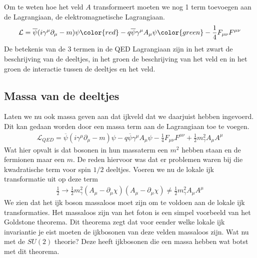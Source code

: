 \documentclass[../main.tex]{subfiles}
\begin{document}
Om te weten hoe het veld $A$ transformeert moeten we nog 1 term toevoegen aan de Lagrangiaan, de elektromagnetische Lagrangiaan.
\begin{equation}
    \begin{aligned}
        \label{eq:lok_ijk_inv_qed}
        \mathcal{L} = \overline \psi (i\gamma^\mu \partial_\mu - m)\psi {\color{red}- q\overline\psi\gamma^\mu A_\mu\psi} {\color{green}- \frac{1}{4} F_{\mu\nu}F^{\mu\nu}}
    \end{aligned}
\end{equation}
De betekenis van de 3 termen in de QED Lagrangiaan zijn in het zwart de beschrijving van de deeltjes, in het groen de beschrijving van het veld en in het groen de interactie tussen de deeltjes en het veld.

\subsection{Massa van de deeltjes}%
\label{sub:massa_van_de_deeltjes}

Laten we nu ook massa geven aan dat ijkveld dat we daarjuist hebben ingevoerd. Dit kan gedaan worden door een massa term aan de Lagrangiaan toe te voegen.
\begin{equation}
    \begin{aligned}
        \label{eq:qed_lagr_met_massa}
        \mathcal{L}_{QED} = \overline \psi (i\gamma^\mu \partial_\mu - m)\psi - q\overline\psi\gamma^\mu A_\mu\psi - \frac{1}{4} F_{\mu\nu}F^{\mu\nu} + \frac{1}{2} m_\gamma^2 A_\mu A^\mu
    \end{aligned}
\end{equation}
Wat hier opvalt is dat bosonen in hun massaterm een $m^2$ hebben staan en de fermionen maar een $m$. De reden hiervoor was dat er problemen waren bij die kwadratische term voor spin $1/2$ deeltjes. Voeren we nu de lokale ijk transformatie uit op deze term
\begin{equation}
    \begin{aligned}
        \label{eq:lok_ijk_tran_massa_term}
        \frac{1}{2} \rightarrow \frac{1}{2} m_\gamma^2(A_\mu-\partial_\mu\chi)(A_\mu-\partial_\mu\chi) \neq \frac{1}{2} m_\gamma^2 A_\mu A^\mu
    \end{aligned}
\end{equation}
We zien dat het ijk boson massaloos moet zijn om te voldoen aan de lokale ijk transformaties. Het massaloos zijn van het foton is een simpel voorbeeld van het Goldstone theorema. Dit theorema zegt dat voor eender welke lokale ijk invariantie je eist moeten de ijkbosonen van deze velden massaloos zijn. Wat nu met de $SU(2)$ theorie? Deze heeft ijkbosonen die een massa hebben wat botst met dit theorema.
\end{document}
